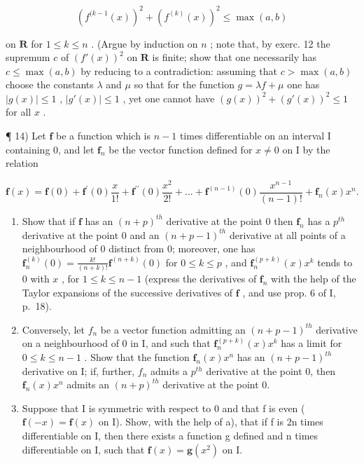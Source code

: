 \[
(f ^ {(k - 1} (x)) ^ {2} + (f ^ {(k)} (x)) ^ {2} \leqslant \max (a, b)
\]

on \(\mathbf{R}\) for \(1 \leqslant k \leqslant n\) . (Argue by induction on \(n\) ; note that, by exerc. 12 the supremum \(c\) of \((f'(x))^2\) on \(\mathbf{R}\) is finite; show that one necessarily has \(c \leqslant \max(a, b)\) by reducing to a contradiction: assuming that \(c > \max(a, b)\) choose the constants \(\lambda\) and \(\mu\) so that for the function \(g = \lambda f + \mu\) one has \(|g(x)| \leqslant 1\) , \(|g'(x)| \leqslant 1\) , yet one cannot have \((g(x))^2 + (g'(x))^2 \leqslant 1\) for all \(x\) .

¶ 14) Let \(\mathbf{f}\) be a function which is \(n - 1\) times differentiable on an interval I containing 0, and let \(\mathbf{f}_n\) be the vector function defined for \(x \neq 0\) on I by the relation

\[
\mathbf {f} (x) = \mathbf {f} (0) + \mathbf {f} ^ {\prime} (0) \frac {x}{1 !} + \mathbf {f} ^ {\prime \prime} (0) \frac {x ^ {2}}{2 !} + \dots + \mathbf {f} ^ {(n - 1)} (0) \frac {x ^ {n - 1}}{(n - 1) !} + \mathbf {f} _ {n} (x) x ^ {n}.
\]

\begin{enumerate}
\def\labelenumi{\alph{enumi})}
\item
  Show that if \(\mathbf{f}\) has an \((n + p)^{th}\) derivative at the point 0 then \(\mathbf{f}_n\) has a \(p^{th}\) derivative at the point 0 and an \((n + p - 1)^{th}\) derivative at all points of a neighbourhood of 0 distinct from 0; moreover, one has \(\mathbf{f}_n^{(k)}(0) = \frac{k!}{(n + k)!}\mathbf{f}^{(n + k)}(0)\) for \(0 \leqslant k \leqslant p\) , and \(\mathbf{f}_n^{(p + k)}(x)x^k\) tends to 0 with \(x\) , for \(1 \leqslant k \leqslant n - 1\) (express the derivatives of \(\mathbf{f}_n\) with the help of the Taylor expansions of the successive derivatives of \(\mathbf{f}\) , and use prop. 6 of I, p.~18).
\item
  Conversely, let \(f_{n}\) be a vector function admitting an \((n + p - 1)^{th}\) derivative on a neighbourhood of 0 in I, and such that \(\mathbf{f}_{n}^{(p+k)}(x)x^{k}\) has a limit for \(0 \leqslant k \leqslant n - 1\) . Show that the function \(\mathbf{f}_{n}(x)x^{n}\) has an \((n + p - 1)^{th}\) derivative on I; if, further, \(f_{n}\) admits a \(p^{th}\) derivative at the point 0, then \(\mathbf{f}_{n}(x)x^{n}\) admits an \((n + p)^{th}\) derivative at the point 0.
\item
  Suppose that I is symmetric with respect to 0 and that f is even ( \(\mathbf{f}(-x) = \mathbf{f}(x)\) on I). Show, with the help of a), that if f is 2n times differentiable on I, then there exists a function g defined and n times differentiable on I, such that \(\mathbf{f}(x) = \mathbf{g}(x^{2})\) on I.
\end{enumerate}

